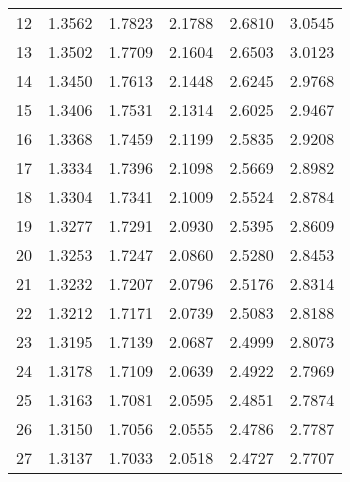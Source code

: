 \documentclass[letterpage]{article}
\begin{document}
\begin{table}[ht!]
\begin{tabular}{|p{}|p{}|p{}|p{}|p{}|p{}|}
12 & 1.3562 & 1.7823 & 2.1788 & 2.6810 & 3.0545 \\ \cline{1-1} \cline{2-2} \cline{3-3} \cline{4-4} \cline{5-5} \cline{6-6}
13 & 1.3502 & 1.7709 & 2.1604 & 2.6503 & 3.0123 \\ \cline{1-1} \cline{2-2} \cline{3-3} \cline{4-4} \cline{5-5} \cline{6-6}
14 & 1.3450 & 1.7613 & 2.1448 & 2.6245 & 2.9768 \\ \cline{1-1} \cline{2-2} \cline{3-3} \cline{4-4} \cline{5-5} \cline{6-6}
15 & 1.3406 & 1.7531 & 2.1314 & 2.6025 & 2.9467 \\ \cline{1-1} \cline{2-2} \cline{3-3} \cline{4-4} \cline{5-5} \cline{6-6}
16 & 1.3368 & 1.7459 & 2.1199 & 2.5835 & 2.9208 \\ \cline{1-1} \cline{2-2} \cline{3-3} \cline{4-4} \cline{5-5} \cline{6-6}
17 & 1.3334 & 1.7396 & 2.1098 & 2.5669 & 2.8982 \\ \cline{1-1} \cline{2-2} \cline{3-3} \cline{4-4} \cline{5-5} \cline{6-6}
18 & 1.3304 & 1.7341 & 2.1009 & 2.5524 & 2.8784 \\ \cline{1-1} \cline{2-2} \cline{3-3} \cline{4-4} \cline{5-5} \cline{6-6}
19 & 1.3277 & 1.7291 & 2.0930 & 2.5395 & 2.8609 \\ \cline{1-1} \cline{2-2} \cline{3-3} \cline{4-4} \cline{5-5} \cline{6-6}
20 & 1.3253 & 1.7247 & 2.0860 & 2.5280 & 2.8453 \\ \cline{1-1} \cline{2-2} \cline{3-3} \cline{4-4} \cline{5-5} \cline{6-6}
21 & 1.3232 & 1.7207 & 2.0796 & 2.5176 & 2.8314 \\ \cline{1-1} \cline{2-2} \cline{3-3} \cline{4-4} \cline{5-5} \cline{6-6}
22 & 1.3212 & 1.7171 & 2.0739 & 2.5083 & 2.8188 \\ \cline{1-1} \cline{2-2} \cline{3-3} \cline{4-4} \cline{5-5} \cline{6-6}
23 & 1.3195 & 1.7139 & 2.0687 & 2.4999 & 2.8073 \\ \cline{1-1} \cline{2-2} \cline{3-3} \cline{4-4} \cline{5-5} \cline{6-6}
24 & 1.3178 & 1.7109 & 2.0639 & 2.4922 & 2.7969 \\ \cline{1-1} \cline{2-2} \cline{3-3} \cline{4-4} \cline{5-5} \cline{6-6}
25 & 1.3163 & 1.7081 & 2.0595 & 2.4851 & 2.7874 \\ \cline{1-1} \cline{2-2} \cline{3-3} \cline{4-4} \cline{5-5} \cline{6-6}
26 & 1.3150 & 1.7056 & 2.0555 & 2.4786 & 2.7787 \\ \cline{1-1} \cline{2-2} \cline{3-3} \cline{4-4} \cline{5-5} \cline{6-6}
27 & 1.3137 & 1.7033 & 2.0518 & 2.4727 & 2.7707 \\ \cline{1-1} \cline{2-2} \cline{3-3} \cline{4-4} \cline{5-5} \cline{6-6}

\end{tabular}
\end{table}
\end{document}
